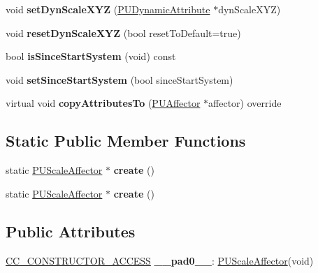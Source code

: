 \begin{DoxyCompactItemize}
\item 
\mbox{\label{classPUScaleAffector_a3ae102173f72eb3ff9007846a1fcbd95}} 
void {\bfseries set\+Dyn\+Scale\+X\+YZ} (\hyperlink{classPUDynamicAttribute}{P\+U\+Dynamic\+Attribute} $\ast$dyn\+Scale\+X\+YZ)
\item 
\mbox{\label{classPUScaleAffector_acc4a425fcc20c4677fea96b38feafd93}} 
void {\bfseries reset\+Dyn\+Scale\+X\+YZ} (bool reset\+To\+Default=true)
\item 
\mbox{\label{classPUScaleAffector_a3ab4fce16a1fe0f2ea226ef3edd48952}} 
bool {\bfseries is\+Since\+Start\+System} (void) const
\item 
\mbox{\label{classPUScaleAffector_a2746f2994a9b4c4261e4e2284f8f783f}} 
void {\bfseries set\+Since\+Start\+System} (bool since\+Start\+System)
\item 
\mbox{\label{classPUScaleAffector_afc26a3634808ad4915fb52784db920fe}} 
virtual void {\bfseries copy\+Attributes\+To} (\hyperlink{classPUAffector}{P\+U\+Affector} $\ast$affector) override
\end{DoxyCompactItemize}
\subsection*{Static Public Member Functions}
\begin{DoxyCompactItemize}
\item 
\mbox{\label{classPUScaleAffector_aedae4f37fcff32b42324ff9b94bf1dd5}} 
static \hyperlink{classPUScaleAffector}{P\+U\+Scale\+Affector} $\ast$ {\bfseries create} ()
\item 
\mbox{\label{classPUScaleAffector_a2f38481319653f759904c8711832008e}} 
static \hyperlink{classPUScaleAffector}{P\+U\+Scale\+Affector} $\ast$ {\bfseries create} ()
\end{DoxyCompactItemize}
\subsection*{Public Attributes}
\begin{DoxyCompactItemize}
\item 
\mbox{\label{classPUScaleAffector_a8fb977320e4d8190cba16d65d80845cb}} 
\hyperlink{_2cocos2d_2cocos_2base_2ccConfig_8h_a25ef1314f97c35a2ed3d029b0ead6da0}{C\+C\+\_\+\+C\+O\+N\+S\+T\+R\+U\+C\+T\+O\+R\+\_\+\+A\+C\+C\+E\+SS} {\bfseries \+\_\+\+\_\+pad0\+\_\+\+\_\+}\+: \hyperlink{classPUScaleAffector}{P\+U\+Scale\+Affector}(void)
\end{DoxyCompactItemize}
